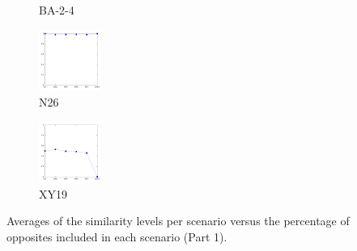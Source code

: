 \documentclass[a4paper,10pt]{article}
\begin{document}
\begin{figure}[ht]
{\begin{subfigure}[b]{2.5cm}
\caption{BA-2-4}
\end{subfigure} 
\begin{subfigure}[b]{2.5cm}
\centering
\includegraphics[height=2cm]{allcat_N26.pdf}
\caption{N26}
\end{subfigure} 
\begin{subfigure}[b]{2.5cm}
\centering
\includegraphics[height=2cm]{allcat_XY19.pdf}
\caption{XY19}
\end{subfigure} 
\caption{Averages of the similarity levels per scenario versus the percentage of opposites included in each scenario (Part 1).}
}\end{figure}
\end{document}
